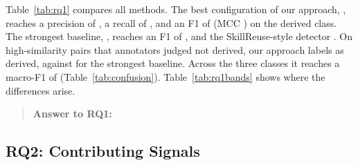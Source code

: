\begin{table}[t]
\caption{RQ1: detection of derived variants (pooled out-of-fold predictions; F1 $\pm$
standard deviation across folds). The last column is the share of non-derived pairs in bands
B1--B3 that a method labels as derived (lower is better).}
\label{tab:rq1}
\small
{}
\end{table}

\begin{table}[t]
\caption{RQ1 by similarity band: precision (P) and recall (R) of the strongest baseline and
of our best model.}
\label{tab:rq1bands}
\small
{}
\end{table}

\begin{table}[t]
\caption{RQ1: confusion matrix of our best model (out-of-fold).}
\label{tab:confusion}
\small
{}
\end{table}

Table~\ref{tab:rq1} compares all methods. The best configuration of our approach,
\ResOursName{}, reaches a precision of \ResOursP{}, a recall of \ResOursR{}, and an F1 of
\ResOursF{} (MCC \ResOursMCC{}) on the derived class. The strongest baseline,
\ResBaseName{}, reaches an F1 of \ResBaseF{}, and the SkillReuse-style detector \ResSRF{}. On
high-similarity pairs that annotators judged not derived, our approach labels \ResOursHiFP{}
as derived, against \ResBaseHiFP{} for the strongest baseline. Across the three classes it
reaches a macro-F1 of \ResMacroF{} (Table~\ref{tab:confusion}). Table~\ref{tab:rq1bands} shows
where the differences arise.

\begin{quote}
\textbf{Answer to RQ1:} 
\end{quote}

\subsection{RQ2: Contributing Signals}

\begin{table}[t]
\caption{RQ2: ablation of feature groups for our best model.}
\label{tab:rq2}
\small
{}
\end{table}

